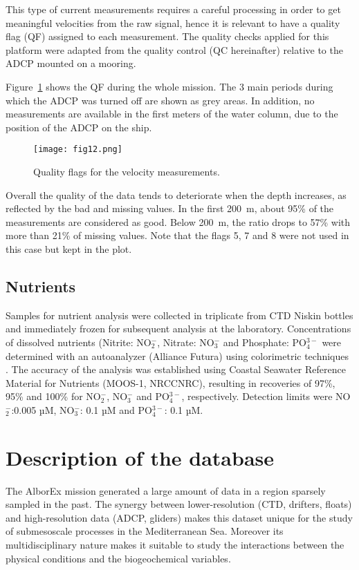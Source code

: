 \documentclass[essd,manuscript]{copernicus}
\begin{document}
This type of current measurements requires a careful processing in order to get meaningful velocities from the raw signal, hence it is relevant to have a quality flag (QF) assigned to each measurement. The quality checks applied for this platform were adapted from the quality control (QC hereinafter) relative to the ADCP mounted on a mooring.

Figure~\ref{fig9b:adcpQC} shows the QF during the whole mission. The 3 main periods during which the ADCP was turned off are shown as grey areas. In addition, no measurements are available in the first meters of the water column, due to the position of the ADCP on the ship.

\begin{figure}[h]
\texttt{[image: fig12.png]}
\caption{Quality flags for the velocity measurements.\label{fig9b:adcpQC}}
\end{figure}

Overall the quality of the data tends to deteriorate when the depth increases, as reflected by the bad and missing values. In the first 200~m, about 95\% of the measurements are considered as good. Below 200~m, the ratio drops to 57\% with more than 21\% of missing values. Note that the flags 5, 7 and 8 were not used in this case but kept in the plot.

\subsection{Nutrients}

Samples for nutrient analysis were collected in triplicate from CTD Niskin bottles and immediately frozen for subsequent analysis at the laboratory. Concentrations of dissolved nutrients (Nitrite: NO$_{2}^{-}$, Nitrate: NO$_{3}^{-}$ and Phosphate: PO$_{4}^{3-}$ were determined with an autoanalyzer (Alliance Futura) using colorimetric techniques \citep{GRASSHOFF1983}. The accuracy of the analysis was established using Coastal Seawater Reference Material for Nutrients (MOOS-1, NRCCNRC), resulting in recoveries of 97\%, 95\% and 100\% for NO$_{2}^{-}$, NO$_{3}^{-}$ and PO$_{4}^{3-}$, respectively. Detection limits were NO$_{2}^{-}$:0.005 µM, NO$_{3}^{-}$: 0.1 µM and PO$_{4}^{3-}$: 0.1 µM.


\section{Description of the database\label{sec:database}}

The AlborEx mission generated a large amount of data in a region sparsely sampled in the past. The synergy between lower-resolution (CTD, drifters, floats) and high-resolution data (ADCP, gliders) makes this dataset unique for the study of submesoscale processes in the Mediterranean Sea. Moreover its multidisciplinary nature makes it suitable to study the interactions between the physical conditions and the biogeochemical variables.
\end{document}
